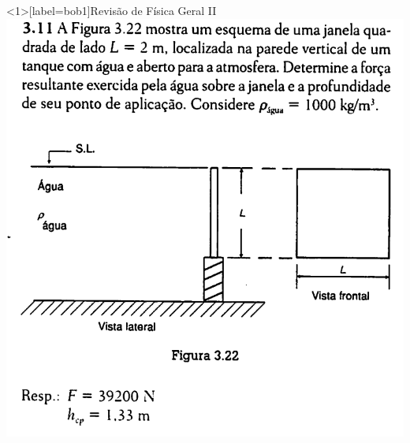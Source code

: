 \documentclass[t,%
brazilian,%
11pt,%
aspectratio=169,%
table%
]{beamer}
\begin{document}
 \begin{frame}<1>[label=bob1]{Revisão de Física Geral II}
     \centering
     \includegraphics[height=\textheight-28pt]{images/Captura de tela de 2025-04-02 16-54-56.png}
 \end{frame}
\end{document}

